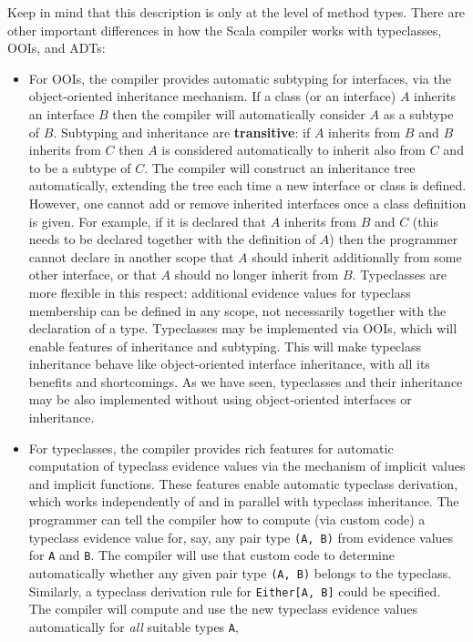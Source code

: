 Keep in mind that this description is only at the level of method
types. There are other important differences in how the Scala compiler
works with typeclasses, OOIs, and ADTs:
\begin{itemize}
\item For OOIs, the compiler provides automatic subtyping for interfaces,
via the object-oriented inheritance mechanism. If a class (or an interface)
$A$ inherits an interface $B$ then the compiler will automatically
consider $A$ as a subtype of $B$. Subtyping and inheritance are
\textbf{transitive}: if $A$ inherits from $B$ and $B$ inherits
from $C$ then $A$ is considered automatically to inherit also from
$C$ and to be a subtype of $C$. The compiler will construct an inheritance
tree automatically, extending the tree each time a new interface or
class is defined. However, one cannot add or remove inherited interfaces
once a class definition is given. For example, if it is declared that
$A$ inherits from $B$ and $C$ (this needs to be declared together
with the definition of $A$) then the programmer cannot declare in
another scope that $A$ should inherit additionally from some other
interface, or that $A$ should no longer inherit from $B$. Typeclasses
are more flexible in this respect: additional evidence values for
typeclass membership can be defined in any scope, not necessarily
together with the declaration of a type. Typeclasses may be implemented
via OOIs, which will enable features of inheritance and subtyping.
This will make typeclass inheritance behave like object-oriented interface
inheritance, with all its benefits and shortcomings. As we have seen,
typeclasses and their inheritance may be also implemented without
using object-oriented interfaces or inheritance.
\item For typeclasses, the compiler provides rich features for automatic
computation of typeclass evidence values via the mechanism of implicit
values and implicit functions. These features enable automatic typeclass
derivation, which works independently of and in parallel with typeclass
inheritance. The programmer can tell the compiler how to compute (via
custom code) a typeclass evidence value for, say, any pair type \lstinline!(A, B)!
from evidence values for \lstinline!A! and \lstinline!B!. The compiler
will use that custom code to determine automatically whether any given
pair type \lstinline!(A, B)! belongs to the typeclass. Similarly,
a typeclass derivation rule for \lstinline!Either[A, B]! could be
specified. The compiler will compute and use the new typeclass evidence
values automatically for \emph{all} suitable types \lstinline!A!,

\end{itemize}
